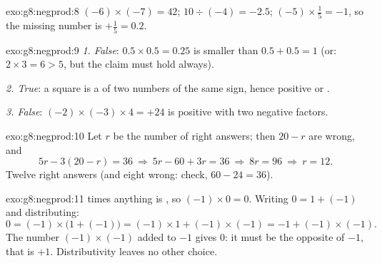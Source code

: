 \begin{solution}{exo:g8:negprod:8}
$(-6) \times (-7) = 42$; \quad
$10 \div (-4) = -2.5$; \quad
$(-5) \times \frac15 = -1$, so the missing number is
$+\frac15 = 0.2$.
\end{solution}

\begin{solution}{exo:g8:negprod:9}
\emph{1. False}: $0.5 \times 0.5 = 0.25$ is smaller than
$0.5 + 0.5 = 1$ (or: $2 \times 3 = 6 > 5$, but the claim must hold
always).

\emph{2. True}: a square is a  of two numbers of the same
sign, hence positive or .

\emph{3. False}: $(-2) \times (-3) \times 4 = +24$ is positive with
two negative factors.
\end{solution}

\begin{solution}{exo:g8:negprod:10}
Let $r$ be the number of right answers; then $20 - r$ are wrong, and
\[
5r - 3(20 - r) = 36
\ \Longrightarrow\
5r - 60 + 3r = 36
\ \Longrightarrow\
8r = 96
\ \Longrightarrow\
r = 12 .
\]
Twelve right answers (and eight wrong: check,
$60 - 24 = 36$).
\end{solution}

\begin{solution}{exo:g8:negprod:11}
 times anything is , so $(-1) \times 0 = 0$. Writing
$0 = 1 + (-1)$ and distributing:
\[
0 = (-1) \times \bigl(1 + (-1)\bigr)
= (-1) \times 1 + (-1) \times (-1)
= -1 + (-1) \times (-1).
\]
The number $(-1) \times (-1)$ added to $-1$ gives $0$: it must be the
opposite of $-1$, that is $+1$. Distributivity leaves no other
choice.
\end{solution}

